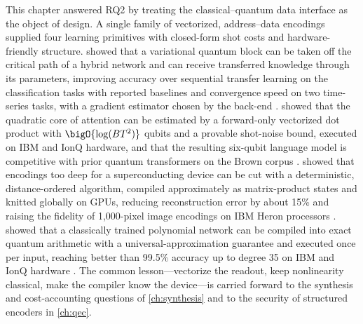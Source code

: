 This chapter answered RQ2 by treating the classical--quantum data interface as the object of design. A single family of vectorized, address--data encodings supplied four learning primitives with closed-form shot costs and hardware-friendly structure. \qpie{} showed that a variational quantum block can be taken off the critical path of a hybrid network and can receive transferred knowledge through its parameters, improving accuracy over sequential transfer learning on the classification tasks with reported baselines and convergence speed on two time-series tasks, with a gradient estimator chosen by the back-end \cite{guo2025qpie}. \vqt{} showed that the quadratic core of attention can be estimated by a forward-only vectorized dot product with $\bigO{\log(BT^2)}$ qubits and a provable shot-noise bound, executed on IBM and IonQ hardware, and that the resulting six-qubit language model is competitive with prior quantum transformers on the Brown corpus \cite{guo2025vqt}. \shardq{} showed that encodings too deep for a superconducting device can be cut with a deterministic, distance-ordered algorithm, compiled approximately as matrix-product states and knitted globally on GPUs, reducing reconstruction error by about 15\% and raising the fidelity of 1,000-pixel image encodings on IBM Heron processors \cite{guo2025shardq}. \nnqa{} showed that a classically trained polynomial network can be compiled into exact quantum arithmetic with a universal-approximation guarantee and executed once per input, reaching better than 99.5\% accuracy up to degree 35 on IBM and IonQ hardware \cite{guo2026nnqa}. The common lesson---vectorize the readout, keep nonlinearity classical, make the compiler know the device---is carried forward to the synthesis and cost-accounting questions of \cref{ch:synthesis} and to the security of structured encoders in \cref{ch:qec}.
